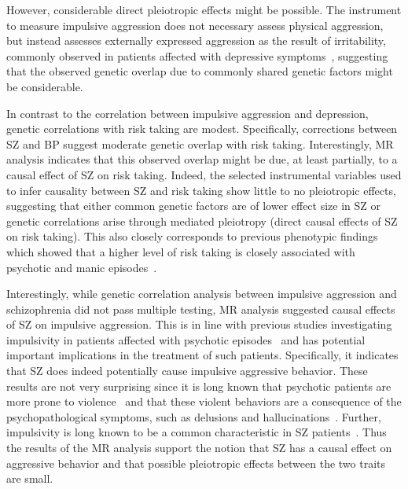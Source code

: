 However, considerable direct pleiotropic effects might be possible.
The  instrument to measure impulsive aggression does not necessary assess physical aggression, but instead assesses externally expressed aggression as the result of irritability,  commonly observed in patients affected with depressive symptoms~\cite{Dutton2013,Clark1994},
 suggesting that the observed genetic overlap due to commonly shared genetic factors might be considerable.

In contrast to the correlation between impulsive aggression and depression, genetic correlations with risk taking are modest.
Specifically, corrections between SZ and BP suggest moderate genetic overlap with risk taking.
Interestingly, MR analysis indicates that this observed overlap might be due, at least partially, to a causal effect of SZ on risk taking.
Indeed, the selected instrumental variables used to infer causality between SZ and risk taking show little to no pleiotropic effects,
 suggesting that either common genetic factors are of lower effect size in SZ or genetic correlations arise through mediated pleiotropy (direct causal effects of SZ on risk taking). 
This also closely corresponds to previous phenotypic findings which showed that a higher level of risk taking is closely associated with psychotic and manic episodes~\cite{Johnson2012,APA1994,AmericanPsychiatricAssociation2013}.

Interestingly, while genetic correlation analysis between impulsive aggression and schizophrenia did not pass multiple testing, MR analysis suggested causal effects of SZ on impulsive aggression. 
This is in line with previous studies investigating impulsivity in patients affected with psychotic episodes~\cite{Ouzir2013} and has potential important implications in the treatment of such patients.
Specifically, it indicates that SZ does indeed potentially cause impulsive aggressive behavior.
These results are not very surprising since it is long known that psychotic patients are more prone to violence~\cite{Douglas2009} and that these violent behaviors are a consequence of the psychopathological symptoms, such as delusions and hallucinations~\cite{Swanson2006}.
Further, impulsivity is long known to be a common characteristic in SZ patients~\cite{Ouzir2013}.
Thus the results of the MR analysis support the notion that SZ has a causal effect on aggressive behavior and that possible pleiotropic effects between the two traits are small.

